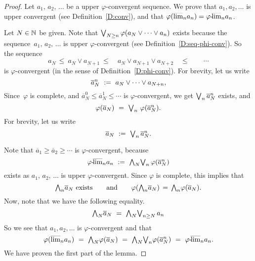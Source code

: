 \documentclass[main.tex]{subfiles}
\begin{document}
\begin{proof}
Let $a_1,\,a_2,\,\dotsc$ be a upper $\varphi$-convergent sequence.
We prove that $a_1,a_2,\dotsc$ is upper convergent
(see Definition~\ref{D:conv}),
and that $\varphi(\smash{\overline{\lim}_{n}}a_n) = {\varphi}\text{-}\!\smash{\overline{\lim}_{n}}a_n$.

Let $N\in\mathbb{N}$ be given.
Note that $\textstyle{\bigvee}_{N\geq n} \,\varphi(a_N\vee\dotsb\vee a_n)$
exists because the sequence~$a_1,\,a_2,\,\dotsc$ is upper $\varphi$-convergent
(see Definition~\ref{D:seq-phi-conv}).
So the sequence
\begin{equation*}
a_N \,\leq\ a_N \vee a_{N+1} 
    \ \leq\quad a_N\vee a_{N+1} \vee a_{N+2} 
    \quad \leq\qquad \dotsb
\end{equation*}
is $\varphi$-convergent (in the sense of
Definition~\ref{D:phi-conv}).
For brevity,
let us write
\begin{equation*}
\overline{a}_{N}^n \ := \ a_N\vee\dotsb\vee a_{N+n},
\end{equation*}
Since~$\varphi$ is complete,
and $\overline{a}_N^0 \leq \overline{a}_N^1 \leq\dotsb$
is $\varphi$-convergent,
we get $\textstyle{\bigvee}_n\,\overline{a}_N^n$ exists,
and 
\begin{equation*}
\varphi(\overline{a}_N) 
\ =\ 
 \bv_{n}\ \varphi( \overline{a}_N^n).
\end{equation*}
For brevity, let us write
\begin{equation*}
\overline{a}_N \ := \ \textstyle{\bigvee}_n \,\overline{a}_N^n.
\end{equation*}

Note that $\overline{a}_1 \geq \overline{a}_2 \geq\dotsb$
is $\varphi$-convergent,
because
\begin{equation*}
\pulim\varphi{n} a_n
\ \eqdf\ 
\bw_N\bv_n\, \varphi(\overline{a}^n_N)
\end{equation*}
exists as $a_1,\,a_2,\,\dotsc$ is upper $\varphi$-convergent.
Since $\varphi$ is complete,
this implies that
\begin{equation*}
\textstyle{\bigwedge}_n \overline{a}_N\text{ exists}
\qquad\text{and}\qquad \varphi(\textstyle{\bigwedge}_n \overline{a}_N)
\,=\,
\textstyle{\bigwedge}_n\varphi(\overline{a}_N).
\end{equation*}
Now,
note that  we have the following equality.
\begin{equation*}
\bw_N \overline{a}_N \ =\ 
\bw_N \bv_{n\geq N} \, a_n
\end{equation*}
So we see that $a_1,a_2,\dotsc$
is $\varphi$-convergent and that
\begin{equation*}
\varphi(\ulim{n}a_n)
\ =\ 
\bw_N\varphi(\overline{a}_N)
\ =\ 
\bw_N \bv_n \varphi(\overline{a}^n_N)
\ =\ 
\pulim\varphi{n} a_n.
\end{equation*}
We have proven the first part of the lemma.


\end{proof}
\end{document}
